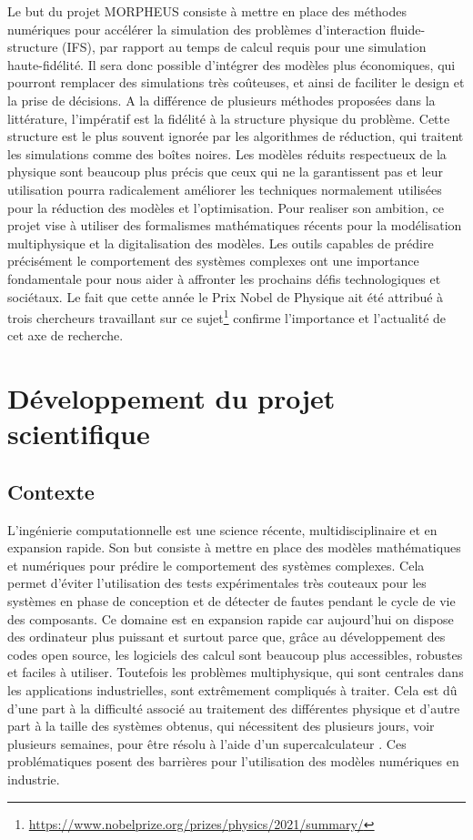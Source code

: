 \documentclass[12pt, french]{article}
\begin{document}
Le but du projet MORPHEUS consiste à mettre en place des méthodes numériques
pour accélérer la simulation des problèmes d'interaction fluide-structure (IFS), par rapport au temps de calcul requis pour une simulation haute-fidélité. Il sera donc possible d’intégrer des modèles plus économiques, qui pourront remplacer des simulations très coûteuses, et ainsi de faciliter le design et la prise de décisions. A la différence de plusieurs méthodes proposées dans la littérature, l'impératif est la fidélité à la structure physique du problème.  Cette structure est le plus souvent ignorée par les algorithmes de réduction, qui traitent les simulations comme des boîtes noires. Les modèles réduits respectueux de la physique sont beaucoup plus précis que ceux qui ne la garantissent pas et leur utilisation pourra radicalement améliorer les techniques normalement utilisées pour la réduction des modèles et l’optimisation. Pour realiser son ambition, ce projet vise à utiliser des formalismes mathématiques récents pour la modélisation multiphysique et la digitalisation des modèles. Les outils capables de prédire précisément le comportement des systèmes complexes ont une importance fondamentale pour nous aider à affronter les prochains défis technologiques et sociétaux. Le fait que cette année le Prix Nobel de Physique ait été attribué à trois chercheurs travaillant sur ce sujet\footnote{\url{https://www.nobelprize.org/prizes/physics/2021/summary/}} confirme
l’importance et l'actualité de cet axe de recherche.


\section{Développement du projet scientifique}





\subsection{Contexte}
L'ingénierie computationnelle est une science récente, multidisciplinaire et en expansion rapide. Son but consiste à mettre en place des modèles mathématiques et numériques pour prédire le comportement des systèmes complexes. Cela permet d'éviter l'utilisation des tests expérimentales très couteaux pour les systèmes en phase de conception et de détecter de fautes pendant le cycle de vie des composants. Ce domaine est en expansion rapide car aujourd'hui on dispose des ordinateur plus puissant et surtout parce que, grâce au développement des codes open source, les logiciels des calcul sont beaucoup plus accessibles, robustes et faciles à utiliser. Toutefois les problèmes multiphysique, qui sont centrales dans les applications industrielles, sont extrêmement compliqués à traiter. Cela est d\^u d'une part à la difficulté associé au traitement des différentes physique et d'autre part à la taille des systèmes obtenus, qui nécessitent des plusieurs jours, voir plusieurs semaines, pour être résolu à l'aide d'un supercalculateur \cite{keyes2013}. Ces problématiques posent des barrières pour l'utilisation des modèles numériques en industrie. \\
\end{document}
